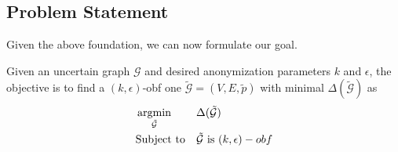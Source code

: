 \subsection{Problem Statement}
Given the above foundation, we can now formulate our goal.  
\vspace{-15pt}
\begin{problem}
     Given an uncertain graph $\mathcal{G}$ and desired anonymization parameters $k$ and $\epsilon$, 
     the objective is to find a  $(k,\epsilon)$-obf one $\tilde{\mathcal{G}}=(V,E,\tilde{\mathit{p}})$ 
     with minimal  $\Delta(\tilde{\mathcal{G}})$ as 
     \vspace{-5pt}
     \begin{equation*}
             \begin{aligned}
                 & \argmin_{\tilde{
                \mathcal{G}}} & & \Delta(\tilde{\mathcal{G}}) \\
                &  \text{Subject to} & &\tilde{\mathcal{G}} \text{~is~} (k,\epsilon)-obf
            \end{aligned}
     \end{equation*}
     \label{prob:unobf}
\end{problem}
